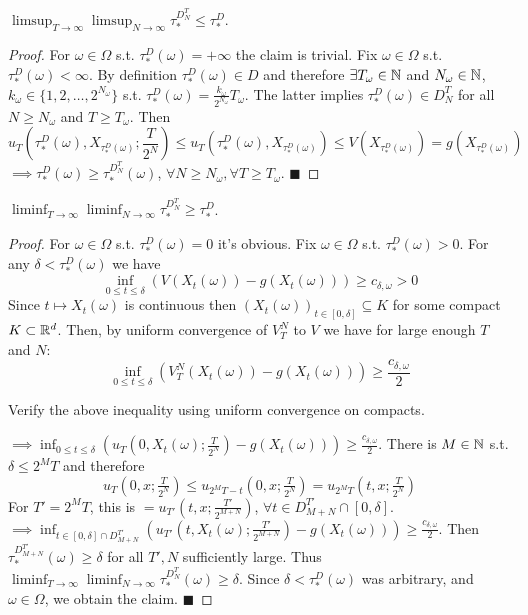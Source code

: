 \begin{lemma}
    $\limsup_{T \to \infty} \limsup_{N \to \infty} \tau_*^{D_N^T} \leq \tau_*^D$.
\end{lemma}

\begin{proof}
    For $\omega \in \Omega$ s.t. $\tau_*^D(\omega) = +\infty$ the claim is trivial.
    Fix $\omega \in \Omega$ s.t. $\tau_*^D(\omega) < \infty$. By definition $\tau_*^D(\omega) \in D$ and therefore $\exists T_\omega \in \mathbb N$ and $N_\omega \in \mathbb N$, $k_\omega \in \{1, 2, \dots, 2^{N_\omega}\}$ s.t. $\tau_*^D(\omega) = \frac{k_\omega}{2^{N_\omega}} T_\omega$. The latter implies $\tau_*^D(\omega) \in D_N^T$ for all $N \geq N_\omega$ and $T \geq T_\omega$.
    Then 
    \[ u_T\left(\tau_*^D(\omega), X_{\tau_*^D(\omega)}; \frac{T}{2^N}\right) \leq u_T(\tau_*^D(\omega), X_{\tau_*^D(\omega)}) \leq V(X_{\tau_*^D(\omega)}) = g(X_{\tau_*^D(\omega)}) \]
    $\implies \tau_*^D(\omega) \geq \tau_*^{D_N^T}(\omega)$, $\forall N \geq N_\omega, \forall T \geq T_\omega$. $\blacksquare$
\end{proof}

\begin{lemma}
    $\liminf_{T \to \infty} \liminf_{N \to \infty} \tau_*^{D_N^T} \geq \tau_*^D$.
\end{lemma}

\begin{proof}
    For $\omega \in \Omega$ s.t. $\tau_*^D(\omega) = 0$ it's obvious.
    Fix $\omega \in \Omega$ s.t. $\tau_*^D(\omega) > 0$. For any $\delta < \tau_*^D(\omega)$ we have 
    \[ \inf_{0 \leq t \leq \delta} (V(X_t(\omega)) - g(X_t(\omega))) \geq c_{\delta, \omega} > 0 \]
    Since $t \mapsto X_t(\omega)$ is continuous then $(X_t(\omega))_{t \in [0, \delta]} \subseteq K$ for some compact $K \subset \mathbb R^d$. Then, by uniform convergence of $V_T^N$ to $V$ we have for large enough $T$ and $N$:
    \[ \inf_{0 \leq t \leq \delta} (V_T^N(X_t(\omega)) - g(X_t(\omega))) \geq \frac{c_{\delta, \omega}}{2} \]
    \begin{homework}
        Verify the above inequality using uniform convergence on compacts.
    \end{homework}
    $\implies \inf_{0 \leq t \leq \delta} (u_T(0, X_t(\omega); \frac{T}{2^N}) - g(X_t(\omega))) \geq \frac{c_{\delta, \omega}}{2}$.
    There is $M \in \mathbb N$ s.t. $\delta \leq 2^M T$ and therefore 
    \[ u_T(0, x; \tfrac{T}{2^N}) \leq u_{2^M T - t}(0, x; \tfrac{T}{2^N}) = u_{2^M T}(t, x; \tfrac{T}{2^N}) \]
    For $T' = 2^M T$, this is $= u_{T'}(t, x; \frac{T'}{2^{M+N}})$, $\forall t \in D_{M+N}^{T'} \cap [0, \delta]$.
    $\implies \inf_{t \in [0, \delta] \cap D_{M+N}^{T'}} (u_{T'}(t, X_t(\omega); \frac{T'}{2^{M+N}}) - g(X_t(\omega))) \geq \frac{c_{\delta, \omega}}{2}$.
    Then $\tau_*^{D_{M+N}^{T'}}(\omega) \geq \delta$ for all $T', N$ sufficiently large. Thus $\liminf_{T \to \infty} \liminf_{N \to \infty} \tau_*^{D_N^T}(\omega) \geq \delta$.
    Since $\delta < \tau_*^D(\omega)$ was arbitrary, and $\omega \in \Omega$, we obtain the claim. $\blacksquare$
\end{proof}

